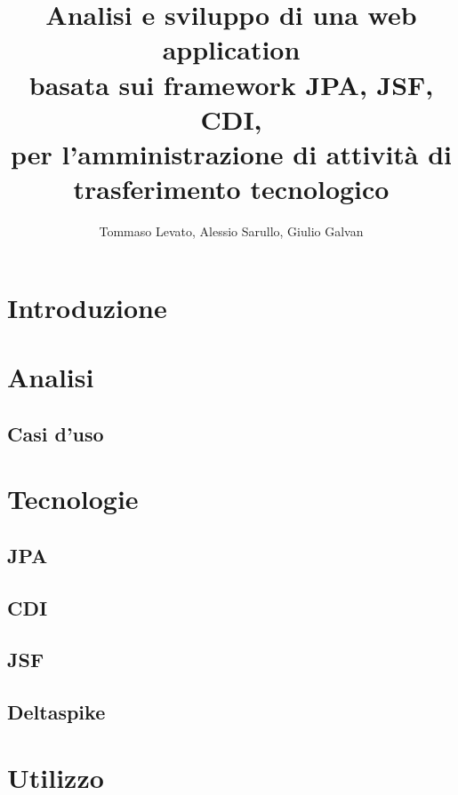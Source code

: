 \documentclass[a4paper,10pt]{report}
\title{Analisi e sviluppo di una web application \\
basata sui framework JPA, JSF, CDI, \\
per l'amministrazione di attività di trasferimento tecnologico}
\author{Tommaso Levato, Alessio Sarullo, Giulio Galvan}
\begin{document}
\maketitle

\begin{abstract}
\end{abstract}

\tableofcontents

\chapter{Introduzione}
\chapter{Analisi}

\section{Casi d'uso}

\chapter{Tecnologie}
\section{JPA}

\section{CDI}
\label{cdi}

\section{JSF}

\section{Deltaspike}

\chapter{Utilizzo}
\end{document}
